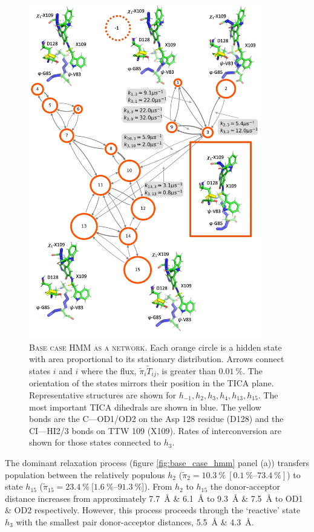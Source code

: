 \begin{figure}[p]
    \centering
    \includegraphics[width=0.9\textwidth]{chapters/aadh/figures/base_case_network_plot.png}
    \caption[Base case HMM as a network]{\textsc{Base case HMM as a network}. Each orange circle is a hidden state with area proportional to its stationary distribution. Arrows connect states $i$ and $i$ where the flux, $\tilde{\pi}_{i}\tilde{T}_{ij}$, is greater than $\SI{0.01}{\percent}$. The orientation of the states mirrors their position in the TICA plane. Representative structures are shown for $h_{-1}, h_{2}, h_{3}, h_{4}, h_{13}, h_{15}$. The most important TICA dihedrals are shown in blue. The yellow bonds are the C---OD1/OD2 on the Asp 128 residue (D128) and the CI---HI2/3 bonds on TTW 109 (X109). Rates of interconversion are shown for those states connected to $h_{3}$. }
    \label{fig:aadh_base_case_network}
\end{figure}

 The dominant relaxation process (figure \ref{fig:base_case_hmm} panel (a)) transfers population between the relatively populous $h_{2}$ ($\tilde{\pi}_{2} = \SI{10.3}{\percent}\ [\SIrange[range-phrase=\text{--}]{0.1}{73.4}{\percent}]$) to state $h_{15}$ ($\tilde{\pi}_{15}=\SI{23.4}{\percent}\ [\SIrange[range-phrase=\text{--}]{1.6}{91.3}{\percent}$]). From $h_{2}$ to $h_{15}$ the donor-acceptor distance increases from approximately \SI{7.7}{\angstrom} \& \SI{6.1}{\angstrom} to \SI{9.3}{\angstrom} \& \SI{7.5}{\angstrom} to OD1 \& OD2 respectively. However, this process proceeds through the `reactive' state $h_{3}$ with the smallest pair donor-acceptor distances, \SI{5.5}{\angstrom} \& \SI{4.3}{\angstrom}.  
 
